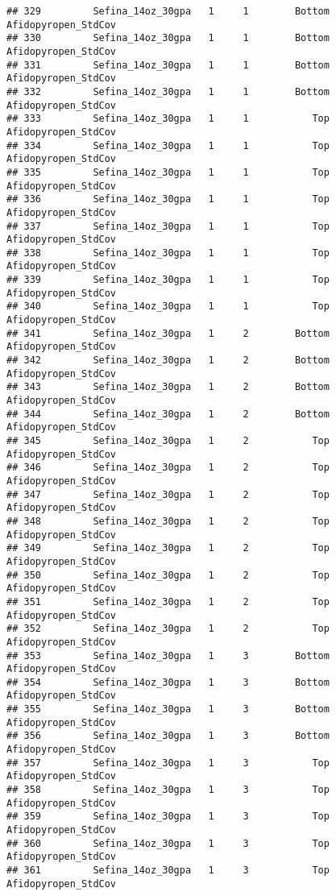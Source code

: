 \documentclass[
]{article}
\begin{document}
\begin{verbatim}
## 329         Sefina_14oz_30gpa   1     1        Bottom    Afidopyropen_StdCov
## 330         Sefina_14oz_30gpa   1     1        Bottom    Afidopyropen_StdCov
## 331         Sefina_14oz_30gpa   1     1        Bottom    Afidopyropen_StdCov
## 332         Sefina_14oz_30gpa   1     1        Bottom    Afidopyropen_StdCov
## 333         Sefina_14oz_30gpa   1     1           Top    Afidopyropen_StdCov
## 334         Sefina_14oz_30gpa   1     1           Top    Afidopyropen_StdCov
## 335         Sefina_14oz_30gpa   1     1           Top    Afidopyropen_StdCov
## 336         Sefina_14oz_30gpa   1     1           Top    Afidopyropen_StdCov
## 337         Sefina_14oz_30gpa   1     1           Top    Afidopyropen_StdCov
## 338         Sefina_14oz_30gpa   1     1           Top    Afidopyropen_StdCov
## 339         Sefina_14oz_30gpa   1     1           Top    Afidopyropen_StdCov
## 340         Sefina_14oz_30gpa   1     1           Top    Afidopyropen_StdCov
## 341         Sefina_14oz_30gpa   1     2        Bottom    Afidopyropen_StdCov
## 342         Sefina_14oz_30gpa   1     2        Bottom    Afidopyropen_StdCov
## 343         Sefina_14oz_30gpa   1     2        Bottom    Afidopyropen_StdCov
## 344         Sefina_14oz_30gpa   1     2        Bottom    Afidopyropen_StdCov
## 345         Sefina_14oz_30gpa   1     2           Top    Afidopyropen_StdCov
## 346         Sefina_14oz_30gpa   1     2           Top    Afidopyropen_StdCov
## 347         Sefina_14oz_30gpa   1     2           Top    Afidopyropen_StdCov
## 348         Sefina_14oz_30gpa   1     2           Top    Afidopyropen_StdCov
## 349         Sefina_14oz_30gpa   1     2           Top    Afidopyropen_StdCov
## 350         Sefina_14oz_30gpa   1     2           Top    Afidopyropen_StdCov
## 351         Sefina_14oz_30gpa   1     2           Top    Afidopyropen_StdCov
## 352         Sefina_14oz_30gpa   1     2           Top    Afidopyropen_StdCov
## 353         Sefina_14oz_30gpa   1     3        Bottom    Afidopyropen_StdCov
## 354         Sefina_14oz_30gpa   1     3        Bottom    Afidopyropen_StdCov
## 355         Sefina_14oz_30gpa   1     3        Bottom    Afidopyropen_StdCov
## 356         Sefina_14oz_30gpa   1     3        Bottom    Afidopyropen_StdCov
## 357         Sefina_14oz_30gpa   1     3           Top    Afidopyropen_StdCov
## 358         Sefina_14oz_30gpa   1     3           Top    Afidopyropen_StdCov
## 359         Sefina_14oz_30gpa   1     3           Top    Afidopyropen_StdCov
## 360         Sefina_14oz_30gpa   1     3           Top    Afidopyropen_StdCov
## 361         Sefina_14oz_30gpa   1     3           Top    Afidopyropen_StdCov

\end{verbatim}
\end{document}

